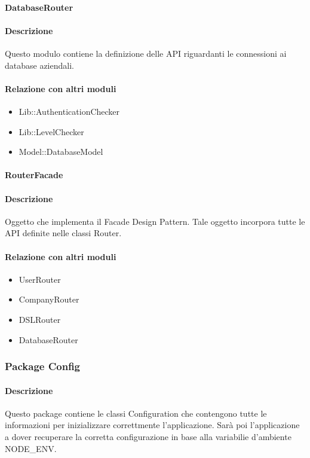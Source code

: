 \paragraph{DatabaseRouter}
\paragraph*{Descrizione}
Questo modulo contiene la definizione delle API riguardanti le connessioni ai database aziendali.

\paragraph*{Relazione con altri moduli}
\begin{itemize}
\item Lib::AuthenticationChecker
\item Lib::LevelChecker
\item Model::DatabaseModel
\end{itemize}

\paragraph{RouterFacade}
\paragraph*{Descrizione}
Oggetto che implementa il Facade Design Pattern. Tale oggetto incorpora tutte le API definite nelle classi Router.

\paragraph*{Relazione con altri moduli}
\begin{itemize}
\item UserRouter
\item CompanyRouter
\item DSLRouter
\item DatabaseRouter
\end{itemize}

\subsubsection{Package Config}
\paragraph*{Descrizione}
Questo package contiene le classi Configuration che contengono tutte le informazioni per inizializzare correttmente l'applicazione. 
Sarà poi l'applicazione a dover recuperare la corretta configurazione in base alla variabilie d'ambiente NODE\_ENV.

